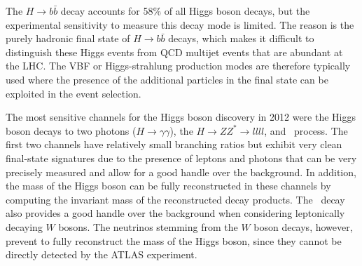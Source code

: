 The $H\rightarrow b\bar{b}$ decay accounts for 58\% of all Higgs boson decays, but the experimental sensitivity to measure this decay mode is limited. The reason is the purely hadronic final state of $H\rightarrow b\bar{b}$ decays, which makes it difficult to distinguish these Higgs events from QCD multijet events that are abundant at the LHC.
The VBF or Higgs-strahlung production modes are therefore typically used where the presence of the additional particles in the final state can be exploited in the event selection.

The most sensitive channels for the Higgs boson discovery in 2012 were the Higgs boson decays to two photons ($H \to \gamma\gamma$), the $H \to ZZ^* \to llll$, and \HWW\ process.
The first two channels have relatively small branching ratios but exhibit very clean final-state signatures due to the presence of leptons and photons that can be very precisely measured and allow for a good handle over the background.
In addition, the mass of the Higgs boson can be fully reconstructed in these channels by computing the invariant mass of the reconstructed decay products.
The \HWW\ decay also provides a good handle over the background when considering leptonically decaying $W$ bosons.
The neutrinos stemming from the $W$ boson decays, however, prevent to fully reconstruct the mass of the Higgs boson, since they cannot be directly detected by the ATLAS experiment.



